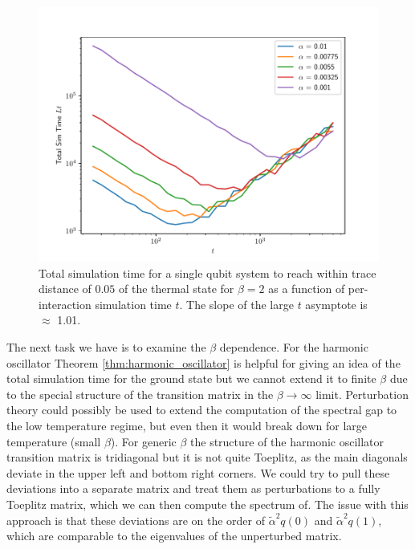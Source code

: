 \documentclass[
 amsmath,amssymb,
 aps,
onecolumn, 
nofootinbib]{revtex4-2}
\begin{document}
\begin{figure} 
    \centering
    \includegraphics[width=0.75\linewidth]{numerics/data/single_qubit_tot_time_vs_t.pdf}
    \caption{Total simulation time for a single qubit system to reach within trace distance of $0.05$ of the thermal state for $\beta = 2$ as a function of per-interaction simulation time $t$. The slope of the large $t$ asymptote is $\approx$ 1.01.}\label{fig:tot_time_vs_single_time}
\end{figure}

The next task we have is to examine the $\beta$ dependence. For the harmonic oscillator Theorem \ref{thm:harmonic_oscillator} is helpful for giving an idea of the total simulation time for the ground state but we cannot extend it to finite $\beta$ due to the special structure of the transition matrix in the $\beta \to \infty$ limit. Perturbation theory could possibly be used to extend the computation of the spectral gap to the low temperature regime, but even then it would break down for large temperature (small $\beta$). For generic $\beta$ the structure of the harmonic oscillator transition matrix is tridiagonal but it is not quite Toeplitz, as the main diagonals deviate in the upper left and bottom right corners. We could try to pull these deviations into a separate matrix and treat them as perturbations to a fully Toeplitz matrix, which we can then compute the spectrum of. The issue with this approach is that these deviations are on the order of $\widetilde{\alpha}^2 q(0)$ and $\widetilde{\alpha}^2 q(1)$, which are comparable to the eigenvalues of the unperturbed matrix.
\end{document}
